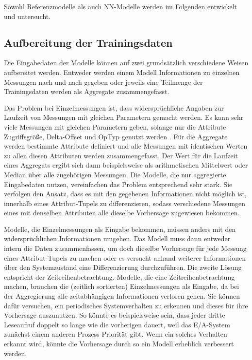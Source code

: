 \documentclass[
	12pt,
	a4paper,
	BCOR10mm,
	DIV14,
	listof=totoc,
	bibliography=totoc,
	headsepline
]{scrreprt}
\begin{document}
Sowohl Referenzmodelle als auch NN-Modelle werden im Folgenden entwickelt und untersucht.
\subsection{Aufbereitung der Trainingsdaten}
Die Eingabedaten der Modelle können auf zwei grundsätzlich verschiedene Weisen aufbereitet werden.
Entweder werden einem Modell Informationen zu einzelnen Messungen nach und nach gegeben oder jeweils eine Teilmenge der Trainingsdaten werden als Aggregate zusammengefasst.\medskip

Das Problem bei Einzelmessungen ist, dass \glqq widersprüchliche\grqq{} Angaben zur Laufzeit von Messungen mit gleichen Parametern gemacht werden. Es kann sehr viele Messungen mit gleichen Parametern geben, solange nur die Attribute Zugriffsgröße, Delta-Offset und OpTyp genutzt werden . 
Für die Aggregate werden bestimmte Attribute definiert und alle Messungen mit identischen Werten zu allen diesen Attributen werden zusammengefasst.
Der Wert für die Laufzeit eines Aggregats ergibt sich dann beispielsweise als arithmetischen Mittelwert oder Median über alle zugehörigen Messungen.
Die Modelle, die nur aggregierte Eingabedaten nutzen, vereinfachen das Problem entsprechend sehr stark. Sie verfolgen den Ansatz, dass es mit den gegebenen Informationen nicht möglich ist, innerhalb eines Attribut-Tupels zu differenzieren, sodass verschiedene Messungen eines mit denselben Attributen alle dieselbe Vorhersage zugewiesen bekommen.

Modelle, die Einzelmessungen als Eingabe bekommen, müssen anders mit den \glqq widersprüchlichen\grqq{} Informationen umgehen.
Das Modell muss dann entweder intern die Daten zusammenfassen, um doch dieselbe Vorhersage für jede Messung eines Attribut-Tupels zu machen oder es versucht anhand weiterer Informationen über den Systemzustand eine Differenzierung durchzuführen.
Die zweite Lösung entspricht der Zeitreihenbetrachtung.
Modelle, die eine Zeitreihenbetrachtung machen, brauchen die (zeitlich sortierten) Einzelmessungen als Eingabe, da bei der Aggregierung alle zeitabhängigen Informationen verloren gehen.
Sie können dafür versuchen, ein periodisches Systemverhalten zu erkennen und dieses für ihre Vorhersage auszunutzen. So könnte es beispielsweise sein, dass jeder dritte Leseaufruf doppelt so lange wie die vorherigen dauert, weil das E/A-System zunächst einem anderen Prozess Priorität gibt.
Wenn ein solches Verhalten erkannt wird, könnte die Vorhersage durch so ein Modell erheblich verbessert werden.
\end{document}
